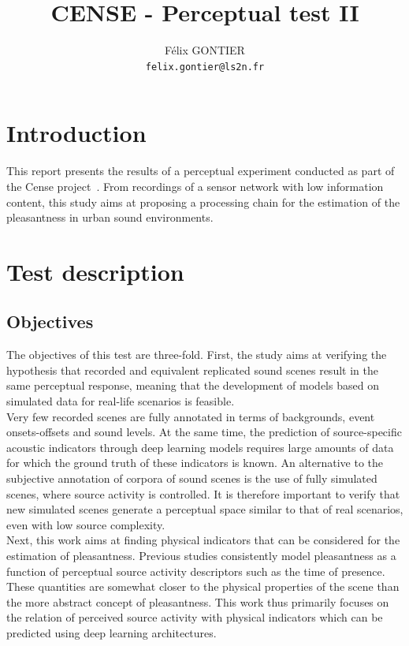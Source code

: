 \documentclass[11pt,a4paper]{article}
\begin{document}
\author{F\'elix GONTIER \\ \texttt{felix.gontier@ls2n.fr}}
\title{CENSE - Perceptual test II}
\maketitle

\section{Introduction}

This report presents the results of a perceptual experiment conducted as part of the Cense project~\cite{cense}. From recordings of a sensor network with low information content, this study aims at proposing a processing chain for the estimation of the pleasantness in urban sound environments.

\section{Test description}
\subsection{Objectives}
\label{sec:test_obj}

The objectives of this test are three-fold. First, the study aims at verifying the hypothesis that recorded and equivalent replicated sound scenes result in the same perceptual response, meaning that the development of models based on simulated data for real-life scenarios is feasible.\\

Very few recorded scenes are fully annotated in terms of backgrounds, event onsets-offsets and sound levels. At the same time, the prediction of source-specific acoustic indicators through deep learning models requires large amounts of data for which the ground truth of these indicators is known. An alternative to the subjective annotation of corpora of sound scenes is the use of fully simulated scenes, where source activity is controlled. It is therefore important to verify that new simulated scenes generate a perceptual space similar to that of real scenarios, even with low source complexity.\\

Next, this work aims at finding physical indicators that can be considered for the estimation of pleasantness. Previous studies consistently model pleasantness as a function of perceptual source activity descriptors such as the time of presence. These quantities are somewhat closer to the physical properties of the scene than the more abstract concept of pleasantness. This work thus primarily focuses on the relation of perceived source activity with physical indicators which can be predicted using deep learning architectures.
\end{document}
